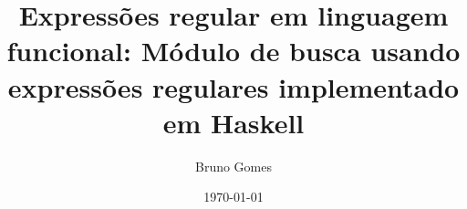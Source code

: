 \documentclass[12pt]{article}
\begin{document}
\title{Expressões regular em linguagem funcional: Módulo de busca usando expressões regulares implementado em Haskell}
\author{Bruno Gomes}
\date{\today}
\maketitle





\printbibliography
\end{document}
